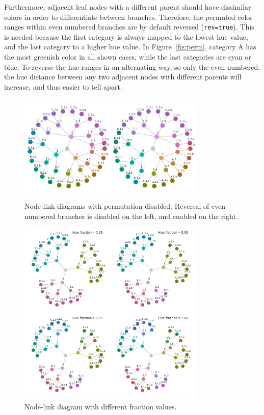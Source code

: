 \documentclass[journal]{vgtc}                %
\begin{document}
Furthermore, adjacent leaf nodes with a different parent should have dissimilar colors in order to differentiate between branches. Therefore, the permuted color ranges within even numbered branches are by default reversed (\texttt{rev=true}). This is needed because the first category is always mapped to the lowest hue value, and the last category to a higher hue value. In Figure~\ref{fig:perm}, category A has the most greenish color in all shown cases, while the last categories are cyan or blue. To reverse the hue ranges in an alternating way, so only the even-numbered, the hue distance between any two adjacent nodes with different parents will increase, and thus easier to tell apart. 

\begin{figure}[!t]

  \centering
  \includegraphics[width=3.5in]{HCPgraph2.pdf}
  \caption{Node-link diagrams with permutation disabled. Reversal of even-numbered branches is disabled on the left, and enabled on the right.}\label{fig:graph_noperm}

\end{figure}

\begin{figure}[!b]
  \centering
  \includegraphics[width=3.5in]{Graph_hue.pdf}
  \caption{Node-link diagram with different fraction values.}\label{fig:graphf}
\end{figure}
\end{document}
